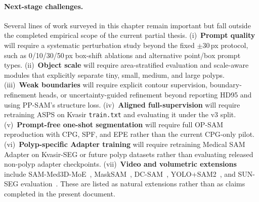 \paragraph{Next-stage challenges.}
Several lines of work surveyed in this chapter remain important but fall outside the completed empirical scope of the current partial thesis. (i)~\textbf{Prompt quality} will require a systematic perturbation study beyond the fixed $\pm30$\,px protocol, such as 0/10/30/50\,px box-shift ablations and alternative point/box prompt types. (ii)~\textbf{Object scale} will require area-stratified evaluation and scale-aware modules that explicitly separate tiny, small, medium, and large polyps. (iii)~\textbf{Weak boundaries} will require explicit contour supervision, boundary-refinement heads, or uncertainty-guided refinement beyond reporting HD95 and using PP-SAM's structure loss. (iv)~\textbf{Aligned full-supervision} will require retraining ASPS on Kvasir \texttt{train.txt} and evaluating it under the v3 split. (v)~\textbf{Prompt-free one-shot segmentation} will require full OP-SAM reproduction with CPG, SPF, and EPE rather than the current CPG-only pilot. (vi)~\textbf{Polyp-specific Adapter training} will require retraining Medical SAM Adapter on Kvasir-SEG or future polyp datasets rather than evaluating released non-polyp adapter checkpoints. (vii)~\textbf{Video and volumetric extensions} include SAM-Med3D-MoE~\cite{wang2024sammed3dmoe}, MaskSAM~\cite{cheng2024masksam}, DC-SAM~\cite{qi2025dcsam}, YOLO+SAM2~\cite{mansoori2024selfprompt}, and SUN-SEG evaluation~\cite{sun2022sunseg}. These are listed as natural extensions rather than as claims completed in the present document.

